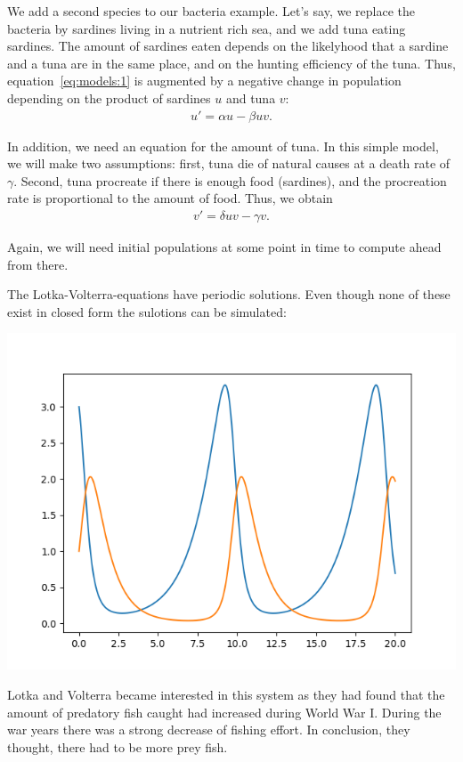 \begin{example}
  We add a second species to our bacteria example. Let's say, we
  replace the bacteria by sardines living in a nutrient rich sea, and
  we add tuna eating sardines. The amount of sardines eaten depends on
  the likelyhood that a sardine and a tuna are in the same place, and
  on the hunting efficiency of the tuna. Thus,
  equation~\eqref{eq:models:1} is augmented by a negative change in
  population depending on the product of sardines $u$ and tuna $v$:
  \begin{gather*}
    u' = \alpha u - \beta u v.
  \end{gather*}

  In addition, we need an equation for the amount of tuna. In this
  simple model, we will make two assumptions: first, tuna die of
  natural causes at a death rate of $\gamma$. Second, tuna procreate
  if there is enough food (sardines), and the procreation rate is
  proportional to the amount of food. Thus, we obtain
  \begin{gather*}
    v' = \delta u v - \gamma v.
  \end{gather*}

  Again, we will need initial populations at some point in time to
  compute ahead from there.
\end{example}

\begin{remark}
  The Lotka-Volterra-equations have periodic solutions. Even though
  none of these exist in closed form the sulotions can be simulated:
  \begin{center}
  \includegraphics[width=.48\textwidth]{fig/lotkavolterra}
  \end{center}
  Lotka and Volterra became interested in this system as they had
  found that the amount of predatory fish caught had increased
  during World War I. During the war years there was a strong
  decrease of fishing effort. In conclusion, they thought, there had
  to be more prey fish.  
\end{remark}


